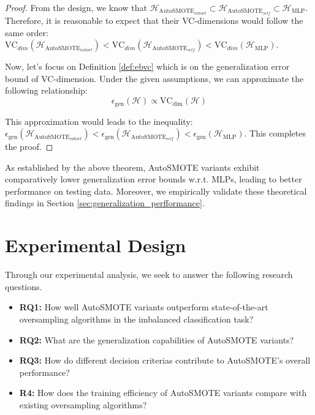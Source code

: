 \begin{proof}
    From the design, we know that $\mathcal{H}_{\text{AutoSMOTE}_{cohort}} \subset \mathcal{H}_{\text{AutoSMOTE}_{self}} \subset \mathcal{H}_{\text{MLP}}$.  Therefore, it is reasonable to expect that their VC-dimensions would follow the same order: $\text{VC}_{dim}(\mathcal{H}_{\text{AutoSMOTE}_{cohort}}) < \text{VC}_{dim}(\mathcal{H}_{\text{AutoSMOTE}_{self}}) < \text{VC}_{dim}(\mathcal{H}_{\text{MLP}})$. 
    
    Now, let's focus on Definition \ref{def:ebvc} which is on the generalization error bound of VC-dimension. Under the given assumptions, we can approximate the following relationship:
    \[
\epsilon_{\text{gen}}(\mathcal{H}) \propto \text{VC}_{\text{dim}}(\mathcal{H})
\]

This approximation would leads to the inequality: $\epsilon_{\text{gen}}(\mathcal{H}_{\text{AutoSMOTE}_{cohort}}) < \epsilon_{\text{gen}}(\mathcal{H}_{\text{AutoSMOTE}_{self}}) < \epsilon_{\text{gen}}(\mathcal{H}_{\text{MLP}})$. This completes the proof.
\end{proof}


As established by the above theorem,  AutoSMOTE variants exhibit comparatively lower generalization error bounds w.r.t. MLPs, leading to better performance on testing data. Moreover, we empirically validate these theoretical findings in Section \ref{sec:generalization_perfformance}.

\section{Experimental Design} \label{sec:expriment}

Through our experimental analysis, we seek to answer the following research questions.

\begin{itemize}
    \item \textbf{RQ1: }How well AutoSMOTE variants outperform state-of-the-art oversampling algorithms in the imbalanced classification task?
    \item \textbf{RQ2: }What are the generalization capabilities of AutoSMOTE variants?
    \item \textbf{RQ3: }How do different decision criterias contribute to AutoSMOTE’s overall performance?
    \item \textbf{R4: }How does the training efficiency of AutoSMOTE variants compare with existing oversampling algorithms?
\end{itemize}

